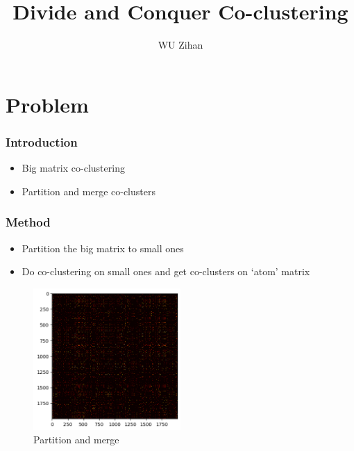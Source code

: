 \documentclass{beamer}
\title{Divide and Conquer Co-clustering}
\author{WU Zihan}
\begin{document}
\maketitle

\section{Problem}
\begin{frame}
    \frametitle{Introduction}
    \begin{itemize}
        \item Big matrix co-clustering
        \item Partition and merge co-clusters
    \end{itemize}
\end{frame}

\begin{frame}
    \frametitle{Method}
    \begin{itemize}
        \item Partition the big matrix to small ones
        \item Do co-clustering on small ones and get co-clusters on `atom' matrix
    \end{itemize}
    \begin{figure}[htbp]
        \centering
        \includegraphics[width=0.5\textwidth]{output.png}
        \caption{Partition and merge}
    \end{figure}
\end{frame}
\end{document}

